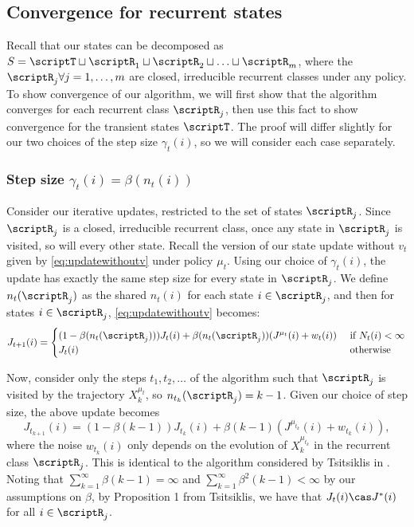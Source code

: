 \documentclass[12pt]{article}
\begin{document}
\subsection{Convergence for recurrent states}

Recall that our states can be decomposed as $S = \scriptT \sqcup \scriptR_1 \sqcup \scriptR_2\sqcup \ldots \sqcup \scriptR_m$, where the $\scriptR_j \forall j=1, \ldots, m$ are closed, irreducible recurrent classes under any policy. To show convergence of our algorithm, we will first show that the algorithm converges for each recurrent class $\scriptR_j$, then use this fact to show convergence for the transient states $\scriptT$. The proof will differ slightly for our two choices of the step size $\gamma_t(i)$, so we will consider each case separately.

\subsubsection{Step size $\gamma_t(i) = \beta(n_t(i))$}
Consider our iterative updates, restricted to the set of states $\scriptR_j$. Since $\scriptR_j$ is a closed, irreducible recurrent class, once any state in $\scriptR_j$ is visited, so will every other state. Recall the version of our state update without $v_t$ given by \eqref{eq:updatewithoutv} under policy $\mu_t$. Using our choice of $\gamma_t(i)$, the update has exactly the same step size for every state in $\scriptR_j$. We define $n_t(\scriptR_j)$ as the shared $n_t(i)$ for each state $i \in \scriptR_j$, and then for states $i \in \scriptR_j$, \eqref{eq:updatewithoutv} becomes:
\begin{equation*}
J_{t+1}(i) =  
	      \begin{cases}
               (1-\beta(n_t(\scriptR_j)))J_t(i) + \beta(n_t(\scriptR_j))(J^{\mu_t}(i) +  w_t(i))& \text{  if $N_t(i) < \infty$}\\
               J_t(i) & \text{ otherwise}\\
            \end{cases}
\end{equation*}

Now, consider only the steps $t_1, t_2, \ldots$ of the algorithm such that $\scriptR_j$ is visited by the trajectory $X_k^{\mu_t}$, so $n_{t_k}(\scriptR_j) = k-1$. Given our choice of step size, the above update becomes
\begin{equation*}
J_{t_{k+1}}(i) = (1-\beta(k-1))J_{t_k}(i) + \beta(k-1)(J^{\mu_{t_k}}(i) +  w_{t_k}(i)),
\end{equation*}
where the noise $w_{t_k}(i)$ only depends on the evolution of $X_k^{\mu_{t_k}}$ in the recurrent class $\scriptR_j$. This is identical to the algorithm considered by Tsitsiklis in \cite{tsitsiklis2002convergence}. Noting that $\sum_{k=1}^\infty \beta(k-1) = \infty$ and $\sum_{k=1}^\infty \beta^2(k-1) < \infty$ by our assumptions on $\beta$, by Proposition 1 from Tsitsiklis, we have that $J_t(i) \cas J^*(i)$ for all $i \in \scriptR_j$.
\end{document}
